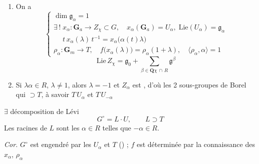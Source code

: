 \documentclass[11pt,a4paper]{article}
\begin{document}
\begin{enumerate}
  \item[(1)] On a
  \[
    \left\{
    \begin{array}{l}
      \dim \mathfrak{g}_\alpha = 1 \\
      \exists\,! \; x_\alpha : \mathbf{G}_a \longrightarrow Z_\chi \subset G,
        \quad x_\alpha(\mathbf{G}_a) = U_\alpha, \;
        \mathrm{Lie}(U_\alpha) = \mathfrak{g}_\alpha \\
      \phantom{\exists\,! \;} t\,x_\alpha(\lambda)\,t^{-1} =
        x_\alpha\bigl(\alpha(t)\lambda\bigr) \\
      \rho_\alpha : \mathbf{G}_m \longrightarrow T, \quad
        f\bigl(x_\alpha(\lambda)\bigr) = \rho_\alpha(1+\lambda), \quad
        \langle \rho_\alpha, \alpha \rangle = 1
    \end{array}
    \right.
  \]
  \[
    \mathrm{Lie}\,Z_\chi = \mathfrak{g}_0 +
      \sum_{\beta \in \mathbf{Q}\chi \,\cap\, R} \mathfrak{g}^{\beta}
  \]
  \item[(2)] Si $\lambda\alpha \in R$, $\lambda \neq 1$, alors
    $\lambda = -1$ et $Z_\alpha$ est  ,
    d'où les 2 sous-groupes de Borel qui $\supset T$, à savoir $T\,U_\alpha$ et
    $T\,U_{-\alpha}$
\end{enumerate}


$\exists$ décomposition de Lévi
\[
  G^{\circ} = L \cdot U, \qquad L \supset T
\]
Les racines de $L$ sont les $\alpha \in R$ telles que $-\alpha \in R$.


\emph{Cor.}  $G^{\circ}$ est engendré par les $U_\alpha$
et $T$ () ; $f$ est déterminée par la connaissance
des $x_\alpha$, $\rho_\alpha$
\end{document}

